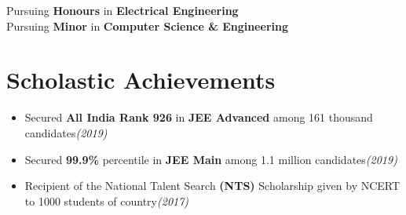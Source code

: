 \documentclass[a4paper]{article}
\newcommand{\rhsmall}[1]{\hfill{\footnotesize{\textsl{(#1)}}}}
\begin{document}
\thispagestyle{firstpage}
Pursuing \textbf{Honours} in \textbf{Electrical Engineering}\\	
Pursuing \textbf{Minor} in \textbf{Computer Science \& Engineering}
\section{Scholastic Achievements}
\begin{itemize}
	\item Secured \textbf{All India Rank 926} in \textbf{JEE Advanced} among 161 thousand candidates\rhsmall{2019}
	\item Secured \textbf{99.9\%} percentile in \textbf{JEE Main} among 1.1 million candidates\rhsmall{2019}
	\item Recipient of the National Talent Search \textbf{(NTS)} Scholarship given by NCERT to 1000 students of country\rhsmall{2017}
\end{itemize}
\end{document}
